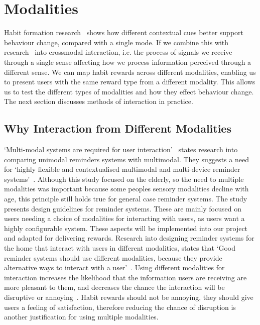 
\newpage

\section{Modalities}
Habit formation research~\cite{article_understanding_use_contextual_cues_design_impl} shows how different contextual cues better support behaviour change, compared with a single mode.
If we combine this with research~\cite{article_natural_cross_modal_mappings} into crossmodal interaction,
i.e. the process of signals we receive through a single sense affecting how we process information perceived through a different sense.
We can map habit rewards across different modalities, enabling us to present users with the same reward type from a different modality.
This allows us to test the different types of modalities and how they effect behaviour change.
The next section discusses methods of interaction in practice.

\subsection{Why Interaction from Different Modalities}
`Multi-modal systems are required for user interaction'~\cite{article_user_centred_multimodal_reminders} states research into comparing unimodal reminders systems with multimodal.
They suggests a need for `highly flexible and contextualised multimodal and multi-device reminder systems'~\cite{article_user_centred_multimodal_reminders}.
Although this study focused on the elderly, so the need to multiple modalities was important because some peoples sensory modalities decline with age,
this principle still holds true for general case reminder systems. The study presents design guidelines for reminder systems.
These are mainly focused on users needing a choice of modalities for interacting with users, as users want a highly configurable system.
These aspects will be implemented into our project and adapted for delivering rewards.\newline
\newline
Research into designing reminder systems for the home that interact with users in different modalities, states that
`Good reminder systems should use different modalities, because they provide alternative ways to interact with a user'~\cite{article_designing_multimodal_reminders_for_home}.
Using different modalities for interaction increases the likelihood that the information users are receiving are more pleasant to them,
and decreases the chance the interaction will be disruptive or annoying~\cite{article_designing_multimodal_reminders_for_home}.
Habit rewards should not be annoying, they should give users a feeling of satisfaction, therefore reducing the chance of disruption is another justification for using multiple modalities.


